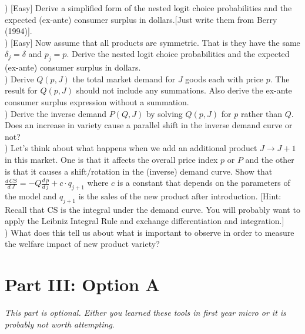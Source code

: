 \documentclass[12pt]{article}
\begin{document}
) [Easy] Derive a simplified form of the nested logit choice probabilities and the expected (ex-ante) consumer surplus in dollars.[Just write them from Berry (1994)].\\

) [Easy] Now assume that all products are symmetric. That is they have the same $\delta_j = \delta$ and $p_j = p$. Derive the nested logit choice probabilities and the expected (ex-ante) consumer surplus in dollars. \\

) Derive $Q(p,J)$ the total market demand for $J$ goods each with price $p$. The result for $Q(p,J)$ should not include any summations. Also derive the ex-ante consumer surplus expression without a summation.\\

) Derive the inverse demand $P(Q,J)$ by solving $Q(p,J)$ for $p$ rather than $Q$. Does an increase in variety cause a parallel shift in the inverse demand curve or not?\\

) Let's think about what happens when we add an additional product $J \rightarrow J+1$ in this market. One is that it affects the overall price index $p$ or $P$ and the other is that it causes a shift/rotation in the (inverse) demand curve. Show that $\frac{d\, CS}{d\, J} = -Q \frac{d\, p}{d\, j} +  c \cdot q_{j+1}$ where $c$ is a constant that depends on the parameters of the model and $q_{j+1}$ is the sales of the new product after introduction. [Hint: Recall that CS is the integral under the demand curve. You will probably want to apply the Leibniz Integral Rule and exchange differentiation and integration.]\\


) What does this tell us about what is important to observe in order to measure the welfare impact of new product variety?





\section*{\normalsize Part III: Option A}
\textit{This part is optional. Either you learned these tools in first year micro or it is probably not worth attempting}.\\
\end{document}
